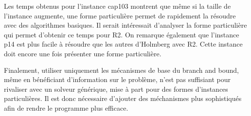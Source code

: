 Les temps obtenus pour l'instance cap103 montrent que même si la taille de l'instance augmente, une forme particulière permet de rapidement la résoudre avec des algorithmes basiques. Il serait intéressait d'analyser la forme particulière qui permet d'obtenir ce temps pour R2.
On remarque également que l'instance p14 est plus facile à résoudre que les autres d'Holmberg avec R2. Cette instance doit encore une fois présenter une forme particulière. \newline

Finalement, utiliser uniquement les mécanismes de base du branch and bound, même en bénéficiant d'information sur le problème, n'est pas suffisiant pour rivaliser avec un solveur générique, mise à part pour des formes d'instances particulières. Il est donc nécessaire d'ajouter des méchanismes plus sophistiqués afin de rendre le programme plus efficace.
